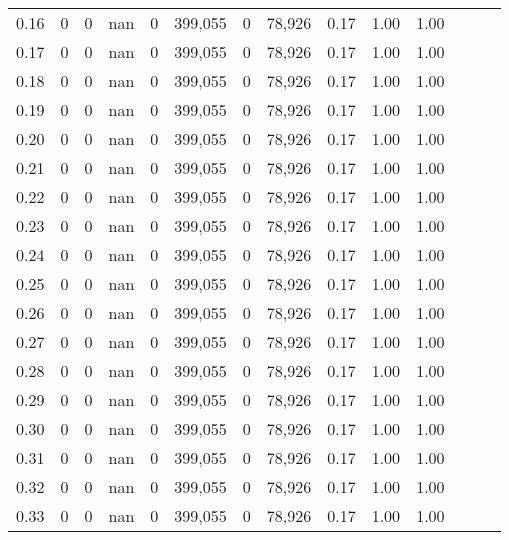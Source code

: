 \begin{tabular}{rrrrrrrrrrrrrr}
0.16 &       0 &       0 &   nan &        0 &  399,055 &       0 &  78,926 &  0.17 &  1.00 &      1.00 \\
0.17 &       0 &       0 &   nan &        0 &  399,055 &       0 &  78,926 &  0.17 &  1.00 &      1.00 \\
0.18 &       0 &       0 &   nan &        0 &  399,055 &       0 &  78,926 &  0.17 &  1.00 &      1.00 \\
0.19 &       0 &       0 &   nan &        0 &  399,055 &       0 &  78,926 &  0.17 &  1.00 &      1.00 \\
0.20 &       0 &       0 &   nan &        0 &  399,055 &       0 &  78,926 &  0.17 &  1.00 &      1.00 \\
0.21 &       0 &       0 &   nan &        0 &  399,055 &       0 &  78,926 &  0.17 &  1.00 &      1.00 \\
0.22 &       0 &       0 &   nan &        0 &  399,055 &       0 &  78,926 &  0.17 &  1.00 &      1.00 \\
0.23 &       0 &       0 &   nan &        0 &  399,055 &       0 &  78,926 &  0.17 &  1.00 &      1.00 \\
0.24 &       0 &       0 &   nan &        0 &  399,055 &       0 &  78,926 &  0.17 &  1.00 &      1.00 \\
0.25 &       0 &       0 &   nan &        0 &  399,055 &       0 &  78,926 &  0.17 &  1.00 &      1.00 \\
0.26 &       0 &       0 &   nan &        0 &  399,055 &       0 &  78,926 &  0.17 &  1.00 &      1.00 \\
0.27 &       0 &       0 &   nan &        0 &  399,055 &       0 &  78,926 &  0.17 &  1.00 &      1.00 \\
0.28 &       0 &       0 &   nan &        0 &  399,055 &       0 &  78,926 &  0.17 &  1.00 &      1.00 \\
0.29 &       0 &       0 &   nan &        0 &  399,055 &       0 &  78,926 &  0.17 &  1.00 &      1.00 \\
0.30 &       0 &       0 &   nan &        0 &  399,055 &       0 &  78,926 &  0.17 &  1.00 &      1.00 \\
0.31 &       0 &       0 &   nan &        0 &  399,055 &       0 &  78,926 &  0.17 &  1.00 &      1.00 \\
0.32 &       0 &       0 &   nan &        0 &  399,055 &       0 &  78,926 &  0.17 &  1.00 &      1.00 \\
0.33 &       0 &       0 &   nan &        0 &  399,055 &       0 &  78,926 &  0.17 &  1.00 &      1.00 \\

\end{tabular}
